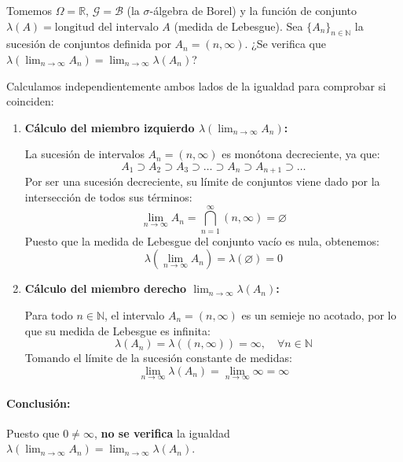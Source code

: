 \begin{problema}
Tomemos $\Omega = \mathbb{R}$, $\mathcal{G} = \mathcal{B}$ (la $\sigma$-álgebra de Borel) y la función de conjunto $\lambda(A) = \text{longitud del intervalo } A$ (medida de Lebesgue). Sea $\{A_n\}_{n \in \mathbb{N}}$ la sucesión de conjuntos definida por $A_n = (n, \infty)$. ¿Se verifica que $\lambda\left(\lim_{n \to \infty} A_n\right) = \lim_{n \to \infty} \lambda(A_n)$?

\tcblower

Calculamos independientemente ambos lados de la igualdad para comprobar si coinciden:

\begin{enumerate}
    \item \textbf{Cálculo del miembro izquierdo $\lambda\left(\lim_{n \to \infty} A_n\right)$:}
    
    La sucesión de intervalos $A_n = (n, \infty)$ es monótona decreciente, ya que:
    \[
        A_1 \supset A_2 \supset A_3 \supset \dots \supset A_n \supset A_{n+1} \supset \dots
    \]
    Por ser una sucesión decreciente, su límite de conjuntos viene dado por la intersección de todos sus términos:
    \[
        \lim_{n \to \infty} A_n = \bigcap_{n=1}^\infty (n, \infty) = \varnothing
    \]
    Puesto que la medida de Lebesgue del conjunto vacío es nula, obtenemos:
    \[
        \lambda\left( \lim_{n \to \infty} A_n \right) = \lambda(\varnothing) = 0
    \]

    \item \textbf{Cálculo del miembro derecho $\lim_{n \to \infty} \lambda(A_n)$:}
    
    Para todo $n \in \mathbb{N}$, el intervalo $A_n = (n, \infty)$ es un semieje no acotado, por lo que su medida de Lebesgue es infinita:
    \[
        \lambda(A_n) = \lambda((n, \infty)) = \infty, \quad \forall n \in \mathbb{N}
    \]
    Tomando el límite de la sucesión constante de medidas:
    \[
        \lim_{n \to \infty} \lambda(A_n) = \lim_{n \to \infty} \infty = \infty
    \]
\end{enumerate}

\paragraph{Conclusión:}
Puesto que $0 \neq \infty$, \textbf{no se verifica} la igualdad $\lambda\left(\lim_{n \to \infty} A_n\right) = \lim_{n \to \infty} \lambda(A_n)$.


\end{problema}
